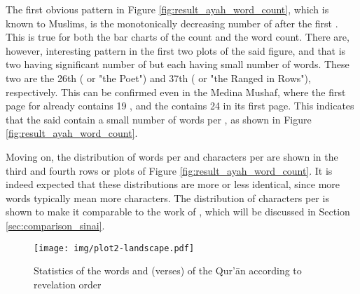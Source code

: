 The first obvious pattern in Figure \ref{fig:result_ayah_word_count}, which is known to Muslims, is the monotonically decreasing number of   after the first  . This is true for both the bar charts of the   count and the word count. There are, however, interesting pattern in the first two plots of the said figure, and that is two   having significant number of   but each having small number of words. These two   are the 26th   (  or "the Poet") and 37th   (  or "the Ranged in Rows"), respectively. This can be confirmed even in the Medina Mushaf, where the first page for   already contains 19  , and the   contains 24   in its first page. This indicates that the said   contain a small number of words per  , as shown in Figure \ref{fig:result_ayah_word_count}.

Moving on, the distribution of words per   and characters per   are shown in the third and fourth rows or plots of Figure \ref{fig:result_ayah_word_count}. It is indeed expected that these distributions are more or less identical, since more words typically mean more characters. The distribution of characters per   is shown to make it comparable to the work of , which will be discussed in Section \ref{sec:comparison_sinai}.

\begin{landscape}
    \begin{figure}[!h]
        \centering
        \texttt{[image: img/plot2-landscape.pdf]}
        \caption{Statistics of the words and   (verses) of the Qur'\=an according to revelation order}
        \label{fig:result_ayah_word_count_rev_order}
    \end{figure}    
\end{landscape}

